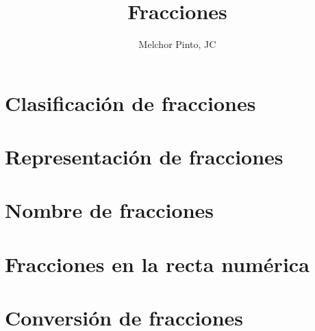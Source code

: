 \documentclass{guia}
\title{Fracciones}
\author{Melchor Pinto, JC}
\begin{document}
\INFO%
\begin{questions}
\section{Clasificación de fracciones}
\questionboxed{}
\section{Representación de fracciones}
\questionboxed{}
\section{Nombre de fracciones}
\questionboxed{}
\section{Fracciones en la recta numérica}
\questionboxed{}
\section{Conversión de fracciones}
\questionboxed{}


\end{questions}
\end{document}
